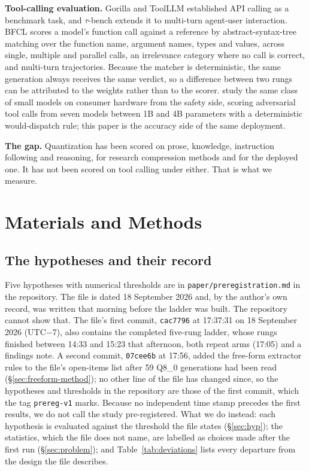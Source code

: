 \documentclass[12pt,letterpaper]{article}
\newcommand{\bfcl}{BFCL}
\begin{document}
\textbf{Tool-calling evaluation.} Gorilla \citep{patil2023gorilla} and ToolLLM \citep{qin2023toolllm} established API calling as a benchmark task, and $\tau$-bench \citep{yao2024taubench} extends it to multi-turn agent-user interaction. \bfcl{} \citep{bfcl2025} scores a model's function call against a reference by abstract-syntax-tree matching over the function name, argument names, types and values, across single, multiple and parallel calls, an irrelevance category where no call is correct, and multi-turn trajectories. Because the matcher is deterministic, the same generation always receives the same verdict, so a difference between two rungs can be attributed to the weights rather than to the scorer. \citet{dondeti2026toolguard} study the same class of small models on consumer hardware from the safety side, scoring adversarial tool calls from seven models between 1B and 4B parameters with a deterministic would-dispatch rule; this paper is the accuracy side of the same deployment.

\textbf{The gap.} Quantization has been scored on prose, knowledge, instruction following and reasoning, for research compression methods and for the deployed one. It has not been scored on tool calling under either. That is what we measure.

\section{Materials and Methods}
\label{sec:method}

\subsection{The hypotheses and their record}
\label{sec:prereg}
Five hypotheses with numerical thresholds are in \texttt{paper/preregistration.md} in the repository. The file is dated 18 September 2026 and, by the author's own record, was written that morning before the ladder was built. The repository cannot show that. The file's first commit, \texttt{cac7796} at 17:37:31 on 18 September 2026 (UTC$-$7), also contains the completed five-rung ladder, whose rungs finished between 14:33 and 15:23 that afternoon, both repeat arms (17:05) and a findings note. A second commit, \texttt{07cee6b} at 17:56, added the free-form extractor rules to the file's open-items list after 59 Q8\_0 generations had been read (\S\ref{sec:freeform-method}); no other line of the file has changed since, so the hypotheses and thresholds in the repository are those of the first commit, which the tag \texttt{prereg-v1} marks. Because no independent time stamp precedes the first results, we do not call the study pre-registered. What we do instead: each hypothesis is evaluated against the threshold the file states (\S\ref{sec:hyp}); the statistics, which the file does not name, are labelled as choices made after the first run (\S\ref{sec:problem}); and Table~\ref{tab:deviations} lists every departure from the design the file describes.
\end{document}
